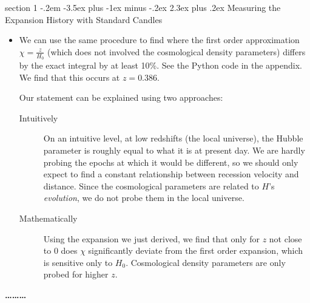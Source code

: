 \documentclass[12pt]{article}
\makeatletter
\newenvironment{problem}{\@startsection
	{section}
	{1}
	{-.2em}
	{-3.5ex plus -1ex minus -.2ex}
	{2.3ex plus .2ex}
	{\pagebreak[3]%
		\large\bf\noindent{Problem }
	}
}
{%
	\begin{center}\large\bf \ldots\ldots\ldots\end{center}}
\makeatother
\begin{document}
\begin{problem}{Measuring the Expansion History with Standard Candles}
\begin{itemize}
			We find that this occurs at $\boxed{z=1.204}$.  Note however, that after about $z\approx0.45$, the second order approximation actually performs better than the third order approximation.  The second order approximation doesn't diverge by 10\% until about $z=2.05$.  See Fig.~\ref{fig:chi_error}.
			\begin{figure}
				\centering
			\end{figure}

			\item We can use the same procedure to find where the first order approximation $\chi = \frac{z}{H_0}$ (which does not involved the cosmological density parameters) differs by the exact integral by at least 10\%.  See the Python code in the appendix.  We find that this occurs at $z=0.386$.
			
			Our statement can be explained using two approaches: \begin{description}
				\item[Intuitively] On an intuitive level, at low redshifts (the local universe), the Hubble parameter is roughly equal to what it is at present day.  We are hardly probing the epochs at which it would be different, so we should only expect to find a constant relationship between recession velocity and distance.  Since the cosmological parameters are related to $H$'s \textit{evolution}, we do not probe them in the local universe.
				
				\item[Mathematically] Using the expansion we just derived, we find that only for $z$ not close to $0$ does $\chi$ significantly deviate from the first order expansion, which is sensitive only to $H_0$.  Cosmological density parameters are only probed for higher $z$. 
			\end{description}
			

\end{itemize}
\end{problem}
\end{document}
